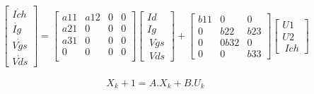 \documentclass{article}
\begin{document}
\begin{gather}

 \begin{bmatrix}  \dot{Ich} \\  \dot{Ig}  \\ \dot{Vgs}  \\ \dot{Vds} \end{bmatrix}
 =
  \begin{bmatrix}
   
   a11 & a12 & 0 & 0 \\
    a21& 0 & 0 & 0 \\
     a31 & 0 & 0 & 0 \\
      0 & 0 & 0 & 0 \\
   \end{bmatrix} \begin{bmatrix}  Id \\  Ig  \\ \ Vgs  \\ \ Vds \end{bmatrix} 
   + \begin{bmatrix}
   
    b11 & 0 & 0 \\
    0 & b22 & b23 \\
    0 & 0b32& 0  \\
    0 & 0 & b33     
    \end{bmatrix}  \begin{bmatrix}  U1 \\  U2  \\ \ Ich \end{bmatrix} 
   
   
\end{gather}




\[ X_k+1 = A.X_k + B.U_k \] 
\end{document}
